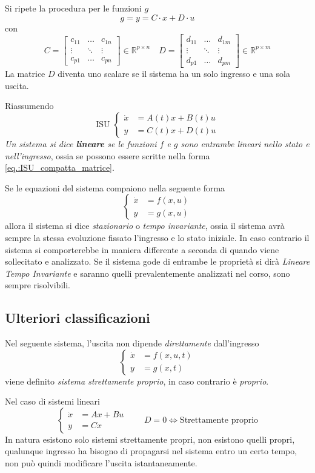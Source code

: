 Si ripete la procedura per le funzioni $g$
$$
g = y = C\cdot x + D\cdot u
$$
con
$$
C = \begin{bmatrix}
c_{11} & \dots & c_{1n} \\
\vdots & \ddots & \vdots \\
c_{p1} & \dots & c_{pn}
\end{bmatrix} \in \mathbb{R}^{p\times n} \quad
D = \begin{bmatrix}
d_{11} & \dots & d_{1m} \\
\vdots & \ddots & \vdots \\
d_{p1} & \dots & d_{pm}
\end{bmatrix} \in \mathbb{R}^{p\times m}
$$
La matrice $D$ diventa uno scalare se il sistema ha un solo ingresso e una sola uscita.

Riassumendo
\begin{equation}
\text{ISU } \left\{\begin{aligned}
\dot{x} &= A(t)x + B(t) u \\
y &= C(t) x + D(t) u
\end{aligned}\right.
\label{eq.:ISU_compatta_matrice}
\end{equation}
\emph{Un sistema si dice \textbf{lineare} se le funzioni $f$ e $g$ sono entrambe lineari nello stato
e nell'ingresso},
ossia se possono essere scritte nella forma \ref{eq.:ISU_compatta_matrice}.

Se le equazioni del sistema compaiono nella seguente forma
$$\left\{\begin{aligned}
\dot{x} &= f(x,u)\\
y &= g(x,u)\end{aligned}\right.
$$
allora il sistema si dice \textit{stazionario} o \textit{tempo invariante},
ossia il sistema avrà sempre la stessa evoluzione fissato l'ingresso e lo stato iniziale. In caso
contrario il sistema si comporterebbe in maniera differente a seconda di quando viene
sollecitato e analizzato.
Se il sistema gode di entrambe le proprietà si dirà \textit{Lineare Tempo Invariante} e saranno
quelli prevalentemente analizzati nel corso, sono sempre risolvibili.
\newpage
\subsection{Ulteriori classificazioni}
Nel seguente sistema, l'uscita non dipende \textit{direttamente} dall'ingresso
$$
\left\{\begin{aligned}
\dot{x} &= f(x,u,t) \\
y &= g(x,t)
\end{aligned}
\right.
$$
viene definito \emph{sistema strettamente proprio}, in caso contrario è \emph{proprio}.

Nel caso di sistemi lineari
$$
\left\{
\begin{aligned}
\dot{x} &= Ax + Bu \\
y &= Cx
\end{aligned}
\right. \qquad D = 0 \Leftrightarrow \text{Strettamente proprio}
$$
In natura esistono solo sistemi strettamente propri, non esistono quelli propri,
qualunque ingresso ha bisogno di propagarsi nel sistema entro un certo tempo, non può quindi
modificare l'uscita istantaneamente.

